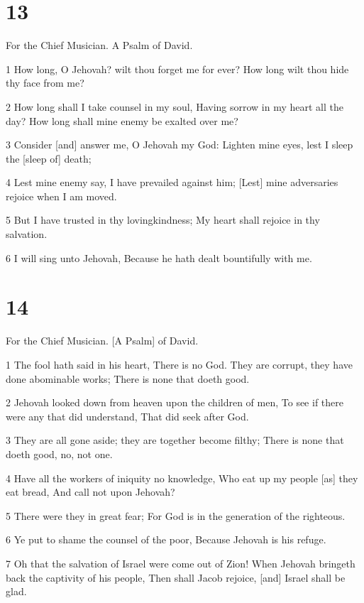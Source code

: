 \chapter{13}

\par For the Chief Musician. A Psalm of David.

\par 1 How long, O Jehovah? wilt thou forget me for ever? How long wilt thou hide thy face from me?
\par 2 How long shall I take counsel in my soul, Having sorrow in my heart all the day? How long shall mine enemy be exalted over me?
\par 3 Consider [and] answer me, O Jehovah my God: Lighten mine eyes, lest I sleep the [sleep of] death;
\par 4 Lest mine enemy say, I have prevailed against him; [Lest] mine adversaries rejoice when I am moved.
\par 5 But I have trusted in thy lovingkindness; My heart shall rejoice in thy salvation.
\par 6 I will sing unto Jehovah, Because he hath dealt bountifully with me.

\chapter{14}

\par For the Chief Musician. [A Psalm] of David.

\par 1 The fool hath said in his heart, There is no God. They are corrupt, they have done abominable works; There is none that doeth good.
\par 2 Jehovah looked down from heaven upon the children of men, To see if there were any that did understand, That did seek after God.
\par 3 They are all gone aside; they are together become filthy; There is none that doeth good, no, not one.
\par 4 Have all the workers of iniquity no knowledge, Who eat up my people [as] they eat bread, And call not upon Jehovah?
\par 5 There were they in great fear; For God is in the generation of the righteous.
\par 6 Ye put to shame the counsel of the poor, Because Jehovah is his refuge.
\par 7 Oh that the salvation of Israel were come out of Zion! When Jehovah bringeth back the captivity of his people, Then shall Jacob rejoice, [and] Israel shall be glad.

